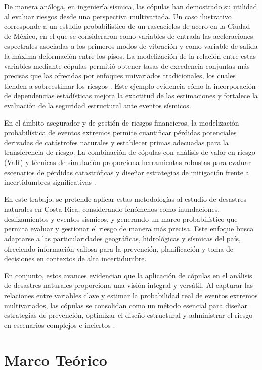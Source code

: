 \documentclass[12pt, a4paper]{article}
\begin{document}
De manera análoga, en ingeniería sísmica, las cópulas han demostrado su utilidad al evaluar riesgos desde una perspectiva multivariada. Un caso ilustrativo corresponde a un estudio probabilístico de un rascacielos de acero en la Ciudad de México, en el que se consideraron como variables de entrada las aceleraciones espectrales asociadas a los primeros modos de vibración y como variable de salida la máxima deformación entre los pisos. La modelización de la relación entre estas variables mediante cópulas permitió obtener tasas de excedencia conjuntas más precisas que las ofrecidas por enfoques univariados tradicionales, los cuales tienden a sobreestimar los riesgos \cite{Siddiqui2022}. Este ejemplo evidencia cómo la incorporación de dependencias estadísticas mejora la exactitud de las estimaciones y fortalece la evaluación de la seguridad estructural ante eventos sísmicos.

En el ámbito asegurador y de gestión de riesgos financieros, la modelización probabilística de eventos extremos permite cuantificar pérdidas potenciales derivadas de catástrofes naturales y establecer primas adecuadas para la transferencia de riesgo. La combinación de cópulas con análisis de valor en riesgo (VaR) y técnicas de simulación proporciona herramientas robustas para evaluar escenarios de pérdidas catastróficas y diseñar estrategias de mitigación frente a incertidumbres significativas \cite{PerezGarcia2004}.

En este trabajo, se pretende aplicar estas metodologías al estudio de desastres naturales en Costa Rica, considerando fenómenos como inundaciones, deslizamientos y eventos sísmicos, y generando un marco probabilístico que permita evaluar y gestionar el riesgo de manera más precisa. Este enfoque busca adaptarse a las particularidades geográficas, hidrológicas y sísmicas del país, ofreciendo información valiosa para la prevención, planificación y toma de decisiones en contextos de alta incertidumbre.

En conjunto, estos avances evidencian que la aplicación de cópulas en el análisis de desastres naturales proporciona una visión integral y versátil. Al capturar las relaciones entre variables clave y estimar la probabilidad real de eventos extremos multivariados, las cópulas se consolidan como un método esencial para diseñar estrategias de prevención, optimizar el diseño estructural y administrar el riesgo en escenarios complejos e inciertos \cite{DelfinerGutierrez2025,Siddiqui2022,PerezGarcia2004}.

\section*{Marco Teórico}
\end{document}
